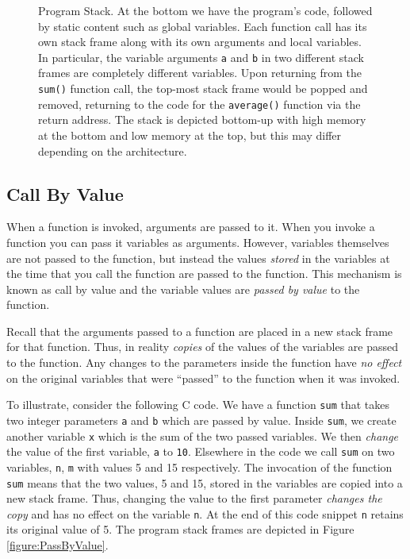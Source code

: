 \begin{figure}[!h]
\centering


\caption[Program Stack]{Program Stack.  At the bottom we have the program's code, followed by
static content such as global variables.  Each function call has its own stack frame along with
its own arguments and local variables.  In particular, the variable arguments \texttt{a} and
\texttt{b} in two different stack frames are completely different variables.  Upon returning
from the \texttt{sum()} function call, the top-most stack frame would be popped and removed, 
returning to the code for the \texttt{average()} function via the return address.
The stack is depicted bottom-up with high memory at the bottom and low memory at the
top, but this may differ depending on the architecture.}
\label{figure:programStack}
\end{figure}



\subsection{Call By Value}

When a function is invoked, arguments are passed to it.  When you
invoke a function you can pass it variables as arguments.  However,
variables themselves are not passed to the function, but instead the
values \emph{stored} in the variables at the time that you call the
function are passed to the function.  This mechanism is known as 
\gls{call by value} and the variable values are \emph{passed by value}
to the function.

Recall that the arguments passed to a function are placed in a new
stack frame for that function.  Thus, in reality \emph{copies} of the
values of the variables are passed to the function.  Any changes to
the parameters inside the function have \emph{no effect} on the
original variables that were ``passed'' to the function when it was 
invoked.  

To illustrate, consider the following C code.  We have a function \texttt{sum}
that takes two integer parameters \texttt{a} and \texttt{b}
which are passed by value.  Inside \texttt{sum}, we create another
variable \texttt{x} which is the sum of the two passed variables.
We then \emph{change} the value of the first variable, \texttt{a}
to \texttt{10}.  Elsewhere in the code we call \texttt{sum}
on two variables, \texttt{n}, \texttt{m} with values
5 and 15 respectively.  The invocation of the function \texttt{sum} 
means that the two values, 5 and 15, stored in the variables are
copied into a new stack frame.  Thus, changing the value to the
first parameter \emph{changes the copy} and has no effect on the
variable \texttt{n}.  At the end of this code snippet \texttt{n}
retains its original value of 5.  The program stack frames are depicted
in Figure \ref{figure:PassByValue}.

